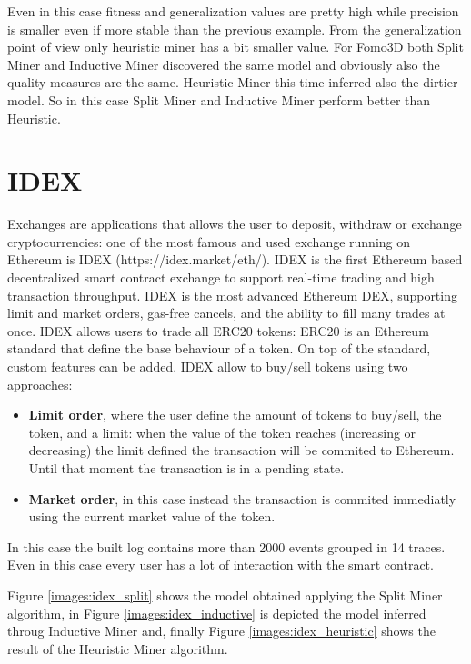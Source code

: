 Even in this case fitness and generalization values are pretty high while precision is smaller even if more stable than the 
previous example. From the generalization point of view only heuristic miner has a bit smaller value. For Fomo3D both Split 
Miner and Inductive Miner discovered the same model and obviously also the quality measures are the same. Heuristic Miner 
this time inferred also the dirtier model. So in this case Split Miner and Inductive Miner perform better than Heuristic.


\section{IDEX}
\label{case_studies:idex}

Exchanges are applications that allows the user to deposit, withdraw or exchange cryptocurrencies: one of the most famous 
and used exchange running on Ethereum is IDEX (https://idex.market/eth/). IDEX is the first Ethereum based decentralized smart contract exchange to 
support real-time trading and high transaction throughput. IDEX is the most advanced Ethereum DEX, supporting limit and market 
orders, gas-free cancels, and the ability to fill many trades at once. IDEX allows users to trade all ERC20 tokens: ERC20 is 
an Ethereum standard that define the base behaviour of a token. On top of the standard, custom features can be added.
IDEX allow to buy/sell tokens using two approaches: 

\begin{itemize}
    \item \textbf{Limit order}, where the user define the amount of tokens to buy/sell, the token, and a limit: when the 
        value of the token reaches (increasing or decreasing) the limit defined the transaction will be commited to Ethereum. 
        Until that moment the transaction is in a pending state.
    \item \textbf{Market order}, in this case instead the transaction is commited immediatly using the current market value 
        of the token.
\end{itemize}

In this case the built log contains more than 2000 events grouped in 14 traces. Even in this case every user has a lot of interaction 
with the smart contract.

Figure \ref{images:idex_split} shows the model obtained applying the Split Miner algorithm, in Figure \ref{images:idex_inductive} 
is depicted the model inferred throug Inductive Miner and, finally Figure \ref{images:idex_heuristic} shows the result of the 
Heuristic Miner algorithm. 

